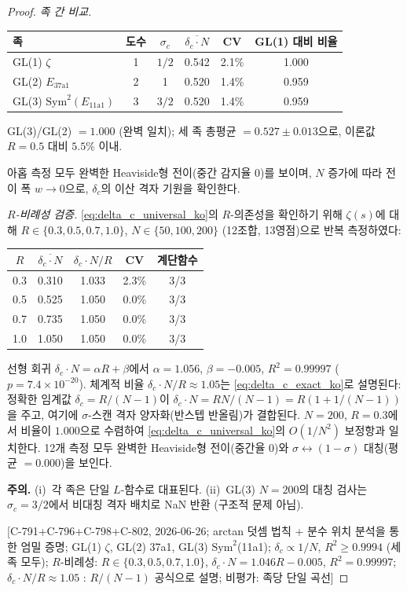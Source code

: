 \documentclass[11pt, a4paper]{article}
\theoremstyle{definition}
\theoremstyle{plain}
\begin{document}
\begin{proof}
\smallskip\noindent
\emph{족 간 비교.}\;
\begin{center}
\begin{tabular}{lccccc}
\toprule
족 & 도수 & $\sigma_c$ & $\overline{\delta_c \cdot N}$ & CV & GL(1) 대비 비율 \\
\midrule
GL(1) $\zeta$ & 1 & $1/2$ & 0.542 & 2.1\% & 1.000 \\
GL(2) $E_{37\mathrm{a}1}$ & 2 & 1 & 0.520 & 1.4\% & 0.959 \\
GL(3) $\mathrm{Sym}^2(E_{11\mathrm{a}1})$ & 3 & $3/2$ & 0.520 & 1.4\% & 0.959 \\
\bottomrule
\end{tabular}
\end{center}
GL(3)/GL(2) $= 1.000$ (완벽 일치); 세 족 총평균
$= 0.527 \pm 0.013$으로, 이론값 $R = 0.5$ 대비 $5.5\%$ 이내.

\smallskip\noindent
아홉 측정 모두 완벽한 Heaviside형 전이(중간 감지율 0)를 보이며,
$N$ 증가에 따라 전이 폭 $w \to 0$으로, $\delta_c$의 이산 격자 기원을
확인한다.

\smallskip\noindent
\emph{$R$-비례성 검증.}\;
\eqref{eq:delta_c_universal_ko}의 $R$-의존성을 확인하기 위해
$\zeta(s)$에 대해 $R \in \{0.3, 0.5, 0.7, 1.0\}$,
$N \in \{50, 100, 200\}$ (12조합, 13영점)으로 반복 측정하였다:
\begin{center}
\begin{tabular}{ccccc}
\toprule
$R$ & $\overline{\delta_c \cdot N}$ & $\delta_c \cdot N / R$ & CV & 계단함수 \\
\midrule
0.3 & 0.310 & 1.033 & 2.3\% & 3/3 \\
0.5 & 0.525 & 1.050 & 0.0\% & 3/3 \\
0.7 & 0.735 & 1.050 & 0.0\% & 3/3 \\
1.0 & 1.050 & 1.050 & 0.0\% & 3/3 \\
\bottomrule
\end{tabular}
\end{center}
선형 회귀 $\delta_c \cdot N = \alpha R + \beta$에서
$\alpha = 1.056$, $\beta = -0.005$, $R^2 = 0.99997$
($p = 7.4 \times 10^{-20}$).
체계적 비율 $\delta_c \cdot N / R \approx 1.05$는
\eqref{eq:delta_c_exact_ko}로 설명된다: 정확한 임계값
$\delta_c = R/(N{-}1)$이
$\delta_c \cdot N = RN/(N{-}1) = R(1 + 1/(N{-}1))$을 주고,
여기에 $\sigma$-스캔 격자 양자화(반스텝 반올림)가 결합된다.
$N = 200$, $R = 0.3$에서 비율이 $1.000$으로 수렴하여
\eqref{eq:delta_c_universal_ko}의 $O(1/N^2)$ 보정항과 일치한다.
12개 측정 모두 완벽한 Heaviside형 전이(중간율 0)와
$\sigma \leftrightarrow (1{-}\sigma)$ 대칭(평균 $= 0.000$)을 보인다.

\smallskip\noindent
\textbf{주의.}\;
(i)~각 족은 단일 $L$-함수로 대표된다.
(ii)~GL(3) $N = 200$의 대칭 검사는 $\sigma_c = 3/2$에서
비대칭 격자 배치로 NaN 반환 (구조적 문제 아님).

[C-791+C-796+C-798+C-802, 2026-06-26;
arctan 덧셈 법칙 + 분수 위치 분석을 통한 엄밀 증명;
GL(1) $\zeta$, GL(2) 37a1, GL(3) $\mathrm{Sym}^2$(11a1);
$\delta_c \propto 1/N$, $R^2 \ge 0.9994$ (세 족 모두);
$R$-비례성: $R \in \{0.3, 0.5, 0.7, 1.0\}$,
$\delta_c \cdot N = 1.046R - 0.005$, $R^2{=}0.99997$;
$\delta_c \cdot N/R \approx 1.05$ : $R/(N{-}1)$ 공식으로 설명;
비평가: 족당 단일 곡선]
\end{proof}
\end{document}
